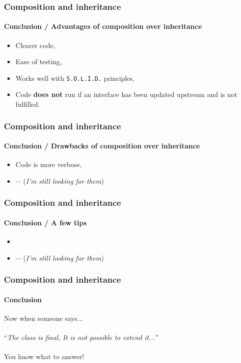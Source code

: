 \begin{frame}
    \frametitle{Composition and inheritance}
    \framesubtitle{Conclusion / Advantages of composition over inheritance}

    \begin{itemize}[<+->]
        \item Clearer code,
        \item Ease of testing,
        \item Works well with \texttt{S.O.L.I.D.} principles,
        \item Code \textbf{does not} run if an interface has been updated upstream and is not fulfilled.
    \end{itemize}
\end{frame}

\begin{frame}
    \frametitle{Composition and inheritance}
    \framesubtitle{Conclusion / Drawbacks of composition over inheritance}

    \begin{itemize}[<+->]
        \item Code is more verbose,
        \item $\cdots$ (\textit{I'm still looking for them})
    \end{itemize}
\end{frame}

\begin{frame}
    \frametitle{Composition and inheritance}
    \framesubtitle{Conclusion / A few tips}

    \begin{itemize}[<+->]
        \item
        \item $\cdots$ (\textit{I'm still looking for them})
    \end{itemize}
\end{frame}

\begin{frame}
    \frametitle{Composition and inheritance}
    \framesubtitle{Conclusion}

    Now when someone says...\\~\\\pause
    ``\textit{The class is final, It is not possible to extend it...''}\\~\\\pause
    You know what to answer!
\end{frame}

